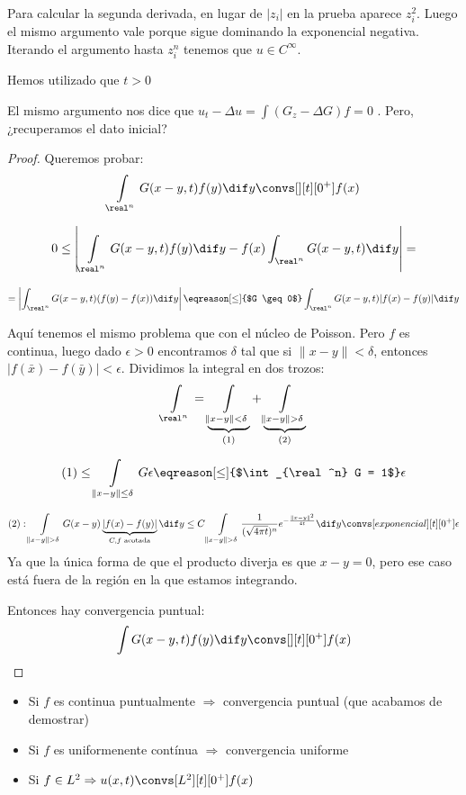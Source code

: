 		Para calcular la segunda derivada, en lugar de $|z_i|$ en la prueba aparece $z_i^2$. Luego el mismo argumento vale porque sigue dominando la exponencial negativa. Iterando el argumento hasta $z_i^n$ tenemos que $u \in C^\infty$.

		\obs Hemos utilizado que $t>0$

		El mismo argumento nos dice que $u_t - \Delta u = \int (G_z - \Delta G) f = 0$ . Pero, ¿recuperamos el dato inicial?

		\begin{proof}

			Queremos probar:
			\[ \int\limits_{\real^n} G(x-y,t) f(y) \dif y \convs[][t][0^+] f(x)\]

			\[ 0 \leq \left| \int\limits_{\real^n} G(x-y,t) f(y) \dif y - f(x) \int_{\real^n} G(x-y,t) \dif y \right| = \]

			\[ = \left| \int_{\real^n} G(x-y,t) (f(y)-f(x))\dif y \right| \eqreason[\leq]{$G \geq 0$} \int_{\real^n} G(x-y,t) |f(x) - f(y)| \dif y \]

			Aquí tenemos el mismo problema que con el núcleo de Poisson. Pero $f$ es continua, luego dado $\epsilon > 0$ encontramos $\delta$ tal que si $\|x-y\| < \delta$, entonces $|f(\bar{x})-f(\bar{y})| < \epsilon$. Dividimos la integral en dos trozos:
			\[ \int\limits_{\real^n} = \underbrace{\int\limits_{\|x-y\| < \delta}}_{(1)} + \underbrace{\int\limits_{\|x-y\|>\delta}}_{(2)}\]

			\[ (1) \leq \int\limits_{\|x-y\|\leq \delta} G \epsilon \eqreason[\leq]{$\int_{\real^n} G = 1$} \epsilon\]

			\[ (2): \int\limits_{\|x-y\|>\delta} G(x-y) \underbrace{| f(x) - f(y) |}_{C,f \text{ acotada}} \dif y \leq C \int\limits_{\|x-y\| > \delta} \frac{1}{(\sqrt{4\pi t})^n} e^{-\frac{\|x-y\|^2}{4t}} \dif y \convs[exponencial][t][0^+] \epsilon\]
			Ya que la única forma de que el producto diverja es que $x-y=0$, pero ese caso está fuera de la región en la que estamos integrando.

			Entonces hay convergencia puntual:
			\[\int G(x-y,t) f(y) \dif y \convs[][t][0^+] f(x)\]

		\end{proof}

		\obs
				\begin{itemize}
					\item Si $f$ es continua puntualmente $\Rightarrow$ convergencia puntual (que acabamos de demostrar)
					\item Si $f$ es uniformenente contínua $\Rightarrow$ convergencia uniforme
					\item Si $f \in L^2 \Rightarrow u(x,t) \convs[L^2][t][0^+] f(x)$
				\end{itemize}


